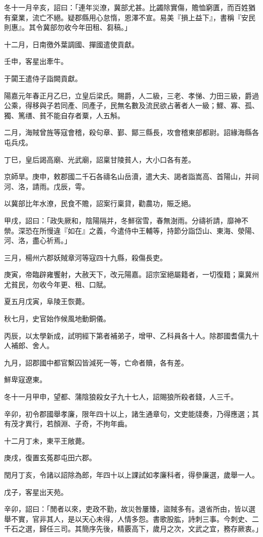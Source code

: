 \begin{pinyinscope}
冬十一月辛亥，詔曰：「連年災潦，冀部尤甚。比蠲除實傷，贍恤窮匱，而百姓猶有棄業，流亡不絕。疑郡縣用心怠惰，恩澤不宣。易美『損上益下』，書稱『安民則惠』。其令冀部勿收今年田租、芻稿。」

十二月，日南徼外葉調國、撣國遣使貢獻。

壬申，客星出牽牛。

于闐王遣侍子詣闕貢獻。

陽嘉元年春正月乙巳，立皇后梁氏。賜爵，人二級，三老、孝悌、力田三級，爵過公乘，得移與子若同產、同產子，民無名數及流民欲占著者人一級；鰥、寡、孤、獨、篤缮、貧不能自存者粟，人五斛。

二月，海賊曾旌等寇會稽，殺句章、鄞、鄮三縣長，攻會稽東部都尉。詔緣海縣各屯兵戍。

丁巳，皇后謁高廟、光武廟，詔稟甘陵貧人，大小口各有差。

京師旱。庚申，敕郡國二千石各禱名山岳瀆，遣大夫、謁者詣嵩高、首陽山，并祠河、洛，請雨。戊辰，雩。

以冀部比年水潦，民食不贍，詔案行稟貸，勸農功，賑乏絕。

甲戌，詔曰：「政失厥和，陰陽隔并，冬鮮宿雪，春無澍雨。分禱祈請，靡神不禜。深恐在所慢違『如在』之義，今遣侍中王輔等，持節分詣岱山、東海、滎陽、河、洛，盡心祈焉。」

三月，楊州六郡妖賊章河等寇四十九縣，殺傷長吏。

庚寅，帝臨辟雍饗射，大赦天下，改元陽嘉。詔宗室絕屬籍者，一切復籍；稟冀州尤貧民，勿收今年更、租、口賦。

夏五月戊寅，阜陵王恢薨。

秋七月，史官始作候風地動銅儀。

丙辰，以太學新成，試明經下第者補弟子，增甲、乙科員各十人。除郡國耆儒九十人補郎、舍人。

九月，詔郡國中都官繫囚皆減死一等，亡命者贖，各有差。

鮮卑寇遼東。

冬十一月甲申，望都、蒲陰狼殺女子九十七人，詔賜狼所殺者錢，人三千。

辛卯，初令郡國舉孝廉，限年四十以上，諸生通章句，文吏能牋奏，乃得應選；其有茂才異行，若顏淵、子奇，不拘年齒。

十二月丁未，東平王敞薨。

庚戌，復置玄菟郡屯田六郡。

閏月丁亥，令諸以詔除為郎，年四十以上課試如孝廉科者，得參廉選，歲舉一人。

戊子，客星出天苑。

辛卯，詔曰：「閒者以來，吏政不勤，故災咎屢臻，盜賊多有。退省所由，皆以選舉不實，官非其人，是以天心未得，人情多怨。書歌股肱，詩刺三事。今刺史、二千石之選，歸任三司。其簡序先後，精覈高下，歲月之次，文武之宜，務存厥衷。」


\end{pinyinscope}
